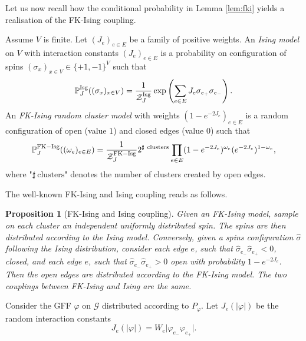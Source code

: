 \documentclass[11pt,a4paper]{amsart}
\numberwithin{equation}{section}
\newtheorem{proposition}{Proposition}[section]
\begin{document}
Let us now recall how the conditional probability in Lemma \ref{lem:fki} yields a realisation of the FK-Ising coupling. 

 Assume $V$ is finite. Let $(J_{e})_{e\in E}$ be a family of positive weights. An \textit{Ising model} on $V$ with interaction constants $(J_{e})_{e\in E}$ is a
probability on configuration of spins $({\sigma}_{x})_{x\in V}\in \{+1,-1\}^V$ such that
\begin{displaymath}
\mathbb{P}^{\rm Isg}_{J}((\sigma_x)_{x\in V})=
\dfrac{1}{\mathcal{Z}^{\rm Isg}_{J}}\exp\left(\sum_{e\in E}
J_{e}\sigma_{e_{+}}\sigma_{e_{-}}\right).
\end{displaymath}
An \textit{FK-Ising random cluster model} with weights
$(1-e^{-2J_{e}})_{e\in E}$ is a random configuration of open (value $1$) and closed
edges (value $0$) such that
\begin{displaymath}
\mathbb{P}^{\rm FK-Isg}_{J}((\omega_{e})_{e\in E})=
\dfrac{1}{\mathcal{Z}^{\rm FK-Isg}_{J}}
2^{\sharp~\text{clusters}}
\prod_{e\in E}(1-e^{-2J_{e}})^{\omega_{e}}(e^{-2J_{e}})^{1-\omega_{e}},
\end{displaymath}
where "$\sharp~\text{clusters}$" denotes the number of clusters created by open edges.

The well-known FK-Ising and Ising coupling reads as follows.
\begin{proposition}[FK-Ising and Ising coupling]
\label{FK-Ising}
Given an FK-Ising model, sample on each cluster an independent uniformly distributed spin. The spins are then distributed according to the Ising model. Conversely, given a spins configuration
$\hat{\sigma}$ following the Ising distribution, consider each edge $e$, such that
$\hat{\sigma}_{e_{-}}\hat{\sigma}_{e_{+}}<0$, closed, and each edge $e$, such that
$\hat{\sigma}_{e_{-}}\hat{\sigma}_{e_{+}}>0$ open with probability
$1-e^{-2J_{e}}$. Then the open edges are distributed according to the FK-Ising model.
The two couplings between FK-Ising and Ising are the same.
\end{proposition}


Consider the GFF $\varphi$ on $\mathcal{G}$ distributed according to $P_{\varphi}$. Let
$J_{e}(\vert\varphi\vert)$ be the random interaction constants
\begin{displaymath}
J_{e}(\vert\varphi\vert)=W_{e}\vert\varphi_{e_{-}}\varphi_{e_{+}}\vert.
\end{displaymath}
\end{document}
